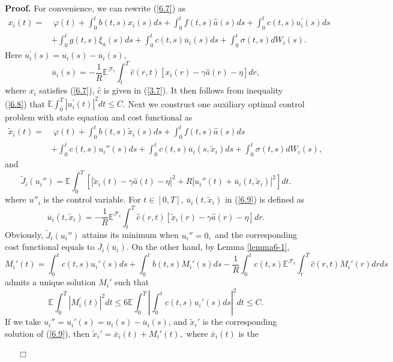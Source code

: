 \documentclass[11pt]{article}
\newenvironment{proof}[1][Proof]{\noindent \textbf{#1.} }{\ \ \  $\Box$}
\def\dbE{\mathbb{E}}
\begin{document}
\begin{proof}
 For convenience, we can rewrite (\ref{6.7}) as
\begin{align*}
x_{i}(t) = & \; \varphi (t)+\int_{0}^{t}b(t,s)x_{i}(s)ds+\int_{0}^{t}f(t,s)\widehat{a}(s)ds+\int_{0}^{t}c(t,s)u_{i}^{\prime }(s)ds \\
&+\int_{0}^{t}g(t,s)\xi _{a}(s)ds+\int_{0}^{t}c(t,s)\overline{u}_{i}(s)ds+\int_{0}^{t}\sigma (t,s)dW_{i}(s).
\end{align*}
%
Here $u_{i}^{\prime }(s)=u_{i}(s)-\overline{u}_{i}(s),$
%
\[
\overline{u}_{i}(s)=-\frac{1}{R}\dbE^{\mathcal{F}_{t}}\int_{t}^{T}\widehat{c}%
(r,t)[x_{i}(r)-\gamma \widehat{a}(r)-\eta ]dr,
\]%
where $x_{i}$ satisfies (\ref{6.7}), $\widehat{c}$ is given in
(\ref{3.7}). It then follows from inequality (\ref{6.8}) that
$\dbE\int_{0}^{T}|u_{i}^{\prime }(t)|^{2}dt\leq C$. Next we
construct one auxiliary optimal control problem with state equation
and cost functional as
%
\begin{align}
\widetilde{x}_{i}(t) = & \; \varphi (t)+\int_{0}^{t}b(t,s)\widetilde{x}_{i}(s)ds+\int_{0}^{t}f(t,s)\widehat{a}(s)ds \nonumber \\
&+\int_{0}^{t}c(t,s)u_{i}''(s)ds+\int_{0}^{t}c(t,s)\overline{u}_{i}(s,\widetilde{x}_{i})ds+\int_{0}^{t}\sigma (t,s)dW_{i}(s), \label{6.9}
\end{align}
%
and
%
\[
\widetilde{J}_{i}(u_{i}'')=\dbE\int_{0}^{T}\left[|\widetilde{x}_{i}(t)-\gamma \widehat{a}(t)-\eta |^{2}+R|u_{i}''(t)+\overline{u}_{i}(t,\widetilde{x}_{i})|^{2}\right]dt.
\]
%
where $u''_{i}$ is the control variable. For $t\in[0,T]$,
$\overline{u}_{i}(t,\widetilde{x}_{i})$ in (\ref{6.9}) is defined as
%
\[
\overline{u}_{i}(t,\widetilde{x}_{i})=-\frac{1}{R}\dbE^{\mathcal{F}_{t}}\!\!\int_{t}^{T}\widehat{c}(r,t)[\widetilde{x}_{i}(r)-\gamma \widehat{a}(r)-\eta ]dr.
\]
%
Obviously, $\widetilde{J}_{i}(u_{i}'')$ attains its
minimum when $u_{i}''=0,$ and the corresponding cost functional equals to $%
\overline{J}_{i}(\overline{u}_{i}).$ On the other hand, by Lemma \ref{lemma6-1},
\[
M_{i}'(t)=\int_{0}^{t}c(t,s)u_{i}'(s)ds+\int_{0}^{t}b(t,s)M_{i}'(s)ds-\frac{1}{R}\int_{0}^{t}c(t,s)\dbE^{\mathcal{F}_{t}}\int_{t}^{T}\widehat{c}(r,t)M_{i}'(r)drds
\]
%
admits a unique solution $M_{i}'$ such that
%
\[
\dbE\int_{0}^{T}|M_{i}^{\prime }(t)|^{2}dt\leq 6\dbE\int_{0}^{T}\left\vert\int_{0}^{t}c(t,s)u_{i}'(s)ds\right\vert^{2}dt\leq C.
\]
%
If we take $u_{i}''=u_{i}'(s)=u_{i}(s)-\overline{u}_{i}(s)$, and
$\widetilde{x}_{i}'$ is the corresponding solution of (\ref{6.9}), then $\widetilde{x}_{i}'=\overline{x}_{i}(t)+M_{i}'(t),$ where $\overline{x}_{i}(t)$ is the

\end{proof}
\end{document}
